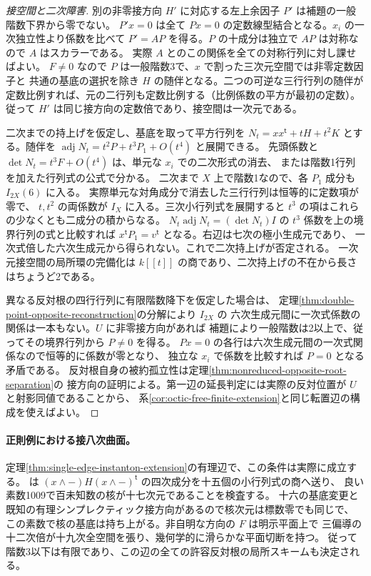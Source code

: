 \begin{proof}[接空間と二次障害]
別の非零接方向 $H'$ に対応する左上余因子 $P'$ は補題の一般階数下界から零でない。
$P'x=0$ は全て $Px=0$ の定数線型結合となる。$x_i$ の一次独立性より係数を比べて
$P'=AP$ を得る。$P$ の十成分は独立で $AP$ は対称なので $A$ はスカラーである。
実際 $A$ とのこの関係を全ての対称行列に対し課せばよい。
$F\ne0$ なので $P$ は一般階数3で、$x$ で割った三次元空間では非零定数因子と
共通の基底の選択を除き $H$ の随伴となる。二つの可逆な三行行列の随伴が
定数比例すれば、元の二行列も定数比例する（比例係数の平方が最初の定数）。
従って $H'$ は同じ接方向の定数倍であり、接空間は一次元である。

二次までの持上げを仮定し、基底を取って平方行列を
$N_t=xx^{\mathsf t}+tH+t^2K$ とする。随伴を
$\operatorname{adj}N_t=t^2 P+t^3 P_1+O(t^4)$ と展開できる。
先頭係数と $\det N_t=t^3 F+O(t^4)$ は、単元な $x_i$ での二次形式の消去、
または階数1行列を加えた行列式の公式で分かる。
二次まで $X$ 上で階数1なので、各 $P_1$ 成分も $I_{2X}(6)$ に入る。
実際単元な対角成分で消去した三行行列は恒等的に定数項が零で、
$t,t^2$ の両係数が $I_X$ に入る。三次小行列式を展開すると
$t^3$ の項はこれらの少なくとも二成分の積からなる。
$N_t\operatorname{adj}N_t=(\det N_t)I$ の $t^3$ 係数を上の境界行列の式と比較すれば
$x^{\mathsf t}P_1=v^{\mathsf t}$ となる。右辺は七次の極小生成元であり、
一次式倍した六次生成元から得られない。これで二次持上げが否定される。
一次元接空間の局所環の完備化は $k[[t]]$ の商であり、二次持上げの不在から長さはちょうど2である。

異なる反対根の四行行列に有限階数降下を仮定した場合は、
定理\ref{thm:double-point-opposite-reconstruction}の分解により $I_{2X}$ の
六次生成元間に一次式係数の関係は一本もない。$U$ に非零接方向があれば
補題により一般階数は2以上で、従ってその境界行列から $P\ne0$ を得る。
$Px=0$ の各行は六次生成元間の一次式関係なので恒等的に係数が零となり、
独立な $x_i$ で係数を比較すれば $P=0$ となる矛盾である。
反対根自身の被約孤立性は定理\ref{thm:nonreduced-opposite-root-separation}の
接方向の証明による。第一辺の延長判定には実際の反対位置が $U$ と射影同値であることから、
系\ref{cor:octic-free-finite-extension}と同じ転置辺の構成を使えばよい。
\end{proof}

\paragraph{正則例における接八次曲面。}
定理\ref{thm:single-edge-instanton-extension}の有理辺で、この条件は実際に成立する。
 は
$(x\wedge -)H(x\wedge -)^{\mathsf t}$ の四次成分を十五個の小行列式の商へ送り、
良い素数1009で百未知数の核が十七次元であることを検査する。
十六の基底変更と既知の有理シンプレクティック接方向があるので核次元は標数零でも同じで、
この素数で核の基底は持ち上がる。非自明な方向の $F$ は明示平面上で
三偏導の十二次倍が十九次全空間を張り、幾何学的に滑らかな平面切断を持つ。
従って階数3以下は有限であり、この辺の全ての許容反対根の局所スキームも決定される。

